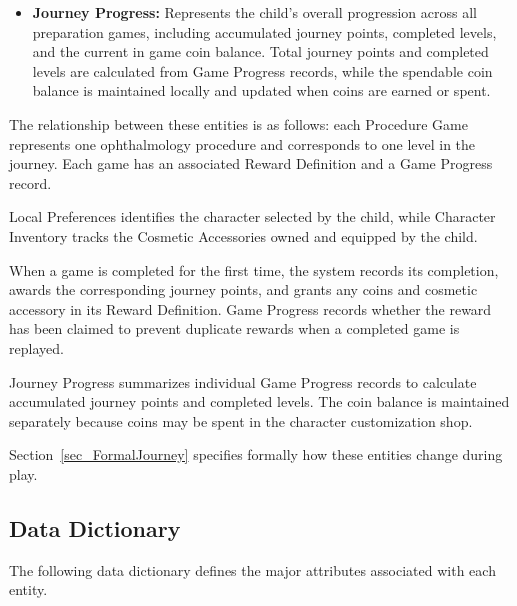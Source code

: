 \documentclass[12pt]{article}
\begin{document}
\begin{itemize}
    \item \textbf{Journey Progress:}
    Represents the child's overall progression across
    all preparation games, including accumulated journey
    points, completed levels, and the current in game
    coin balance. Total journey points and completed
    levels are calculated from Game Progress records,
    while the spendable coin balance is maintained
    locally and updated when coins are earned or spent.

\end{itemize}

The relationship between these entities is as follows:
each Procedure Game represents one ophthalmology procedure
and corresponds to one level in the journey. Each game has
an associated Reward Definition and a Game Progress record.

Local Preferences identifies the character selected by the
child, while Character Inventory tracks the Cosmetic
Accessories owned and equipped by the child.

When a game is completed for the first time, the system
records its completion, awards the corresponding journey
points, and grants any coins and cosmetic accessory in
its Reward Definition.
Game Progress records whether the reward has been claimed
to prevent duplicate rewards when a completed game is
replayed.

Journey Progress summarizes individual Game Progress
records to calculate accumulated journey points and
completed levels. The coin balance is maintained
separately because coins may be spent in the
character customization shop.

Section~\ref{sec_FormalJourney} specifies formally how
these entities change during play.


\subsection{Data Dictionary}

The following data dictionary defines the major
attributes associated with each entity.
\end{document}
